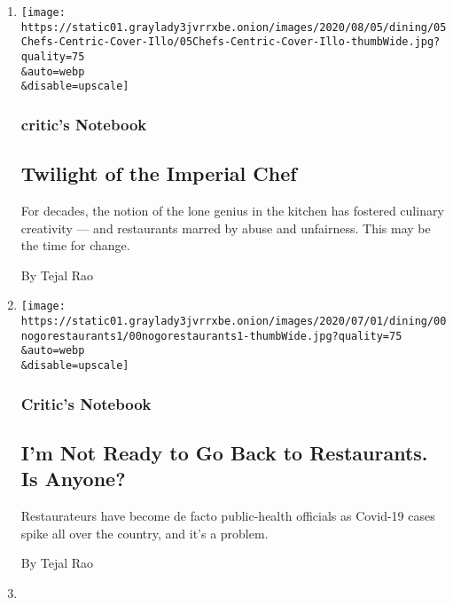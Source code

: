 \begin{enumerate}
\def\labelenumi{\arabic{enumi}.}
\item
  \href{/2020/08/04/dining/chef-restaurant-culture.html}{}

  \texttt{[image: https://static01.graylady3jvrrxbe.onion/images/2020/08/05/dining/05Chefs-Centric-Cover-Illo/05Chefs-Centric-Cover-Illo-thumbWide.jpg?quality=75\\\&auto=webp\\\&disable=upscale]}

  \hypertarget{critics-notebook}{%
  \subsubsection{critic's Notebook}\label{critics-notebook}}

  \hypertarget{twilight-of-the-imperial-chef}{%
  \subsection{Twilight of the Imperial
  Chef}\label{twilight-of-the-imperial-chef}}

  For decades, the notion of the lone genius in the kitchen has fostered
  culinary creativity --- and restaurants marred by abuse and
  unfairness. This may be the time for change.

  By Tejal Rao
\item
  \href{/2020/06/30/dining/restaurant-risks-coronavirus.html}{}

  \texttt{[image: https://static01.graylady3jvrrxbe.onion/images/2020/07/01/dining/00nogorestaurants1/00nogorestaurants1-thumbWide.jpg?quality=75\\\&auto=webp\\\&disable=upscale]}

  \hypertarget{critics-notebook-1}{%
  \subsubsection{Critic's Notebook}\label{critics-notebook-1}}

  \hypertarget{im-not-ready-to-go-back-to-restaurants-is-anyone}{%
  \subsection{I'm Not Ready to Go Back to Restaurants. Is
  Anyone?}\label{im-not-ready-to-go-back-to-restaurants-is-anyone}}

  Restaurateurs have become de facto public-health officials as Covid-19
  cases spike all over the country, and it's a problem.

  By Tejal Rao
\item
  \href{/2020/06/24/magazine/the-secret-to-perfect-pizza-at-home-cast-iron.html}{}


\end{enumerate}
